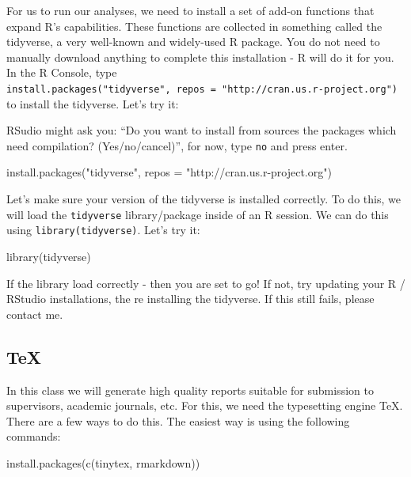 \documentclass[
]{krantz}
\newenvironment{Shaded}{\begin{snugshade}}{\end{snugshade}}
\newcommand{\AttributeTok}[1]{\textcolor[rgb]{0.77,0.63,0.00}{#1}}
\newcommand{\FunctionTok}[1]{\textcolor[rgb]{0.00,0.00,0.00}{#1}}
\newcommand{\NormalTok}[1]{#1}
\newcommand{\StringTok}[1]{\textcolor[rgb]{0.31,0.60,0.02}{#1}}
\begin{document}
For us to run our analyses, we need to install a set of add-on functions that expand R's capabilities. These functions are collected in something called the tidyverse, a very well-known and widely-used R package. You do not need to manually download anything to complete this installation - R will do it for you. In the R Console, type \texttt{install.packages("tidyverse",\ repos\ =\ "http://cran.us.r-project.org")} to install the tidyverse. Let's try it:

RSudio might ask you: ``Do you want to install from sources the packages which need compilation? (Yes/no/cancel)'', for now, type \texttt{no} and press enter.

\begin{Shaded}
\begin{Highlighting}[]
\FunctionTok{install.packages}\NormalTok{(}\StringTok{"tidyverse"}\NormalTok{, }\AttributeTok{repos =} \StringTok{"http://cran.us.r{-}project.org"}\NormalTok{)}
\end{Highlighting}
\end{Shaded}

Let's make sure your version of the tidyverse is installed correctly. To do this, we will load the \texttt{tidyverse} library/package inside of an R session. We can do this using \texttt{library(tidyverse)}. Let's try it:

\begin{Shaded}
\begin{Highlighting}[]
\FunctionTok{library}\NormalTok{(tidyverse)}
\end{Highlighting}
\end{Shaded}

If the library load correctly - then you are set to go! If not, try updating your R / RStudio installations, the re installing the tidyverse. If this still fails, please contact me.

\hypertarget{tex}{%
\subsection{TeX}\label{tex}}

In this class we will generate high quality reports suitable for submission to supervisors, academic journals, etc. For this, we need the typesetting engine TeX. There are a few ways to do this. The easiest way is using the following commands:

\begin{Shaded}
\begin{Highlighting}[]
\FunctionTok{install.packages}\NormalTok{(}\FunctionTok{c}\NormalTok{(}\StringTok{\textquotesingle{}tinytex\textquotesingle{}}\NormalTok{, }\StringTok{\textquotesingle{}rmarkdown\textquotesingle{}}\NormalTok{))}
\end{Highlighting}
\end{Shaded}
\end{document}
